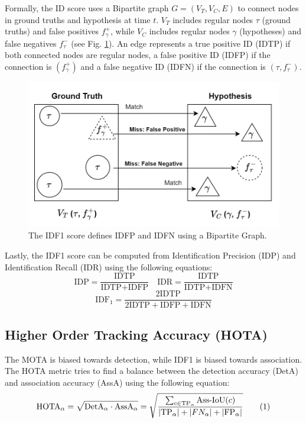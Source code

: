 Formally, the ID score uses a Bipartite graph $G = (V_T, V_C, E)$ to connect nodes in ground truths and hypothesis at time $t$. $V_T$ includes regular nodes $\tau$ (ground truths) and false positives $f^+_{\gamma}$, while $V_C$ includes regular nodes $\gamma$ (hypotheses) and false negatives $f^-_{\tau}$ (see Fig. \ref{fig:idf1_bipartite}). An edge represents a true positive ID (IDTP) if both connected nodes are regular nodes, a false positive ID (IDFP) if the connection is $(f^+_{\gamma})$  and a false negative ID (IDFN) if the connection is $(\tau, f^-_{\tau})$. 

\begin{figure}[H]
    \centering
    \includegraphics[width=\linewidth]{figures/chapter_tracking/bipartite.jpg}
  \caption{The IDF1 score defines IDFP and IDFN using a Bipartite Graph.}
  \label{fig:idf1_bipartite}
\end{figure}

Lastly, the IDF1 score can be computed from Identification Precision (IDP) and Identification Recall (IDR) using the following equations:
\begin{equation}
    \text{IDP} = \frac{\text{IDTP}}{\text{IDTP} + \text{IDFP}} \quad 
    \text{IDR} = \frac{\text{IDTP}}{\text{IDTP} + \text{IDFN}}
\end{equation}
\begin{equation}
    \text{IDF}_1 = \frac{2 \text{IDTP}}{2 \text{IDTP} + \text{IDFP} + \text{IDFN}}
\end{equation}

\subsection{Higher Order Tracking Accuracy (HOTA)}

The MOTA is biased towards detection, while IDF1 is biased towards association. The HOTA metric tries to find a balance between the detection accuracy (DetA) and association accuracy (AssA) using the following equation:
\begin{equation}
    \text{HOTA}_{\alpha} = \sqrt{\text{DetA}_{\alpha} \cdot \text{AssA}_{\alpha}} = \sqrt{\frac{\sum_{c \in \text{TP}_\alpha} \text{Ass-IoU}(c)}{|\text{TP}_{\alpha}| + | FN_{\alpha}| + | \text{FP}_{\alpha}| }} \numberthis
\end{equation}

